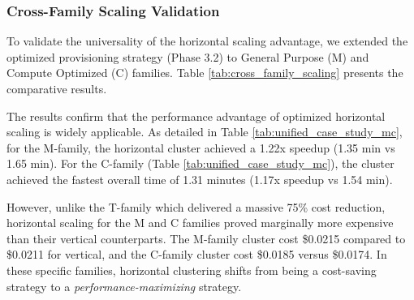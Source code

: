 \documentclass[conference]{IEEEtran}
\begin{document}
	\subsubsection{Cross-Family Scaling Validation}
	
	To validate the universality of the horizontal scaling advantage, we extended the optimized provisioning strategy (Phase 3.2) to General Purpose (M) and Compute Optimized (C) families. Table \ref{tab:cross_family_scaling} presents the comparative results.
	
	\begin{table}[h]
		\centering
		\caption{Scaling Strategy Comparison across Instance Families (Phase 3.2). Time values include $\pm$3\% margin of error.}
		\label{tab:cross_family_scaling}
	\end{table}

	The results confirm that the performance advantage of optimized horizontal scaling is widely applicable. As detailed in Table \ref{tab:unified_case_study_mc}, for the M-family, the horizontal cluster achieved a 1.22x speedup (1.35 min vs 1.65 min). For the C-family (Table \ref{tab:unified_case_study_mc}), the cluster achieved the fastest overall time of 1.31 minutes (1.17x speedup vs 1.54 min).
	
	However, unlike the T-family which delivered a massive 75\% cost reduction, horizontal scaling for the M and C families proved marginally more expensive than their vertical counterparts. The M-family cluster cost \$0.0215 compared to \$0.0211 for vertical, and the C-family cluster cost \$0.0185 versus \$0.0174. In these specific families, horizontal clustering shifts from being a cost-saving strategy to a \textit{performance-maximizing} strategy.
	
\end{document}
